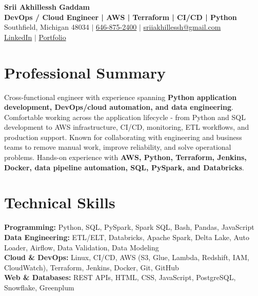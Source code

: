 \documentclass[letterpaper,10pt]{article}
\begin{document}
\fontsize{9.35pt}{10.45pt}\selectfont

\begin{center}
    {\LARGE \textbf{Srii Akhillessh Gaddam}} \\[-1pt]
    \textbf{DevOps / Cloud Engineer | AWS | Terraform | CI/CD | Python} \\[2pt]
    Southfield, Michigan 48034 $|$
    \href{tel:6468752400}{646-875-2400} $|$
    \href{mailto:sriiakhillessh@gmail.com}{sriiakhillessh@gmail.com} \\[1pt]
    \href{https://www.linkedin.com/in/srii-akhiilessh-gaddam-b48668191/}{LinkedIn} $|$
    \href{https://sriiakhillesshg.github.io/portfolio/}{Portfolio}
\end{center}
\vspace{-8pt}

\section{Professional Summary}
\small{Cross-functional engineer with experience spanning \textbf{Python application development, DevOps/cloud automation, and data engineering}. Comfortable working across the application lifecycle - from Python and SQL development to AWS infrastructure, CI/CD, monitoring, ETL workflows, and production support. Known for collaborating with engineering and business teams to remove manual work, improve reliability, and solve operational problems. Hands-on experience with \textbf{AWS, Python, Terraform, Jenkins, Docker, data pipeline automation, SQL, PySpark, and Databricks}.}

\section{Technical Skills}
\small{
\textbf{Programming:} Python, SQL, PySpark, Spark SQL, Bash, Pandas, JavaScript \\
\textbf{Data Engineering:} ETL/ELT, Databricks, Apache Spark, Delta Lake, Auto Loader, Airflow, Data Validation, Data Modeling \\
\textbf{Cloud \& DevOps:} Linux, CI/CD, AWS (S3, Glue, Lambda, Redshift, IAM, CloudWatch), Terraform, Jenkins, Docker, Git, GitHub \\
\textbf{Web \& Databases:} REST APIs, HTML, CSS, JavaScript, PostgreSQL, Snowflake, Greenplum
}
\end{document}

